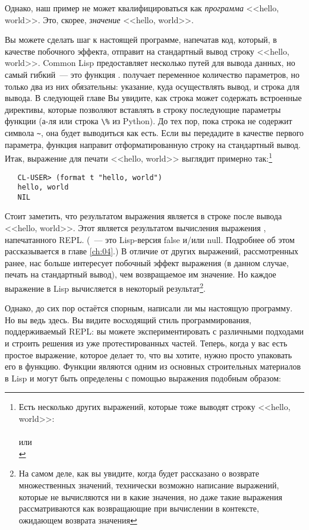 Однако, наш пример не может квалифицироваться как \emph{программа} <<hello, world>>.
Это, скорее, \emph{значение} <<hello, world>>.

Вы можете сделать шаг к настоящей программе, напечатав код, который, в качестве побочного
эффекта, отправит на стандартный вывод строку <<hello, world>>. Common Lisp предоставляет
несколько путей для вывода данных, но самый гибкий~--- это функция .  получает
переменное количество параметров, но только два из них обязательны: указание, куда
осуществлять вывод, и строка для вывода. В следующей главе Вы увидите, как строка может
содержать встроенные директивы, которые позволяют вставлять в строку последующие параметры
функции (а-ля  или строка \lstinline|\%| из Python). До тех пор, пока строка
не содержит символа \lstinline|~|, она будет выводиться как есть. Если вы передадите  в
качестве первого параметра, функция  направит отформатированную строку на
стандартный вывод. Итак, выражение  для печати <<hello, world>> выглядит примерно
так:\footnote{Есть несколько других выражений, которые тоже выводят строку <<hello, world>>:\\
   \\
  или \\
  }

\begin{verbatim}
   CL-USER> (format t "hello, world")
   hello, world
   NIL
\end{verbatim}

Стоит заметить, что результатом выражения  является  в строке после
вывода <<hello, world>>. Этот  является результатом вычисления выражения ,
напечатанного REPL. (~--- это Lisp-версия false и/или null. Подробнее об этом
рассказывается в главе \ref{ch:04}.) В отличие от других выражений, рассмотренных ранее, нас больше
интересует побочный эффект выражения  (в данном случае, печать на стандартный
вывод), чем возвращаемое им значение. Но каждое выражение в Lisp вычисляется в некоторый
результат\footnote{На самом деле, как вы увидите, когда будет рассказано о возврате
  множественных значений, технически возможно написание выражений, которые не вычисляются
  ни в какие значения, но даже такие выражения рассматриваются как возвращающие  при
  вычислении в контексте, ожидающем возврата значения}.

Однако, до сих пор остаётся спорным, написали ли мы настоящую программу. Но вы ведь
здесь. Вы видите восходящий стиль программирования, поддерживаемый REPL: вы можете
экспериментировать с различными подходами и строить решения из уже протестированных
частей. Теперь, когда у вас есть простое выражение, которое делает то, что вы хотите,
нужно просто упаковать его в функцию. Функции являются одним из основных строительных
материалов в Lisp и могут быть определены с помощью выражения  подобным образом:

